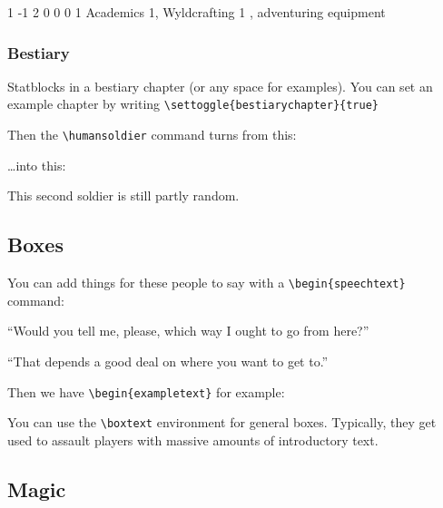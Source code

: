 \documentclass[a4paper,openany]{book}
\begin{document}
\begin{multicols}{2}
\begin{verbatim}
\end{verbatim}


{1}%
{-1}%
{{2}%
{0}%
{0}}%
{0}%
{1}%
{Academics 1, Wyldcrafting 1}%
{\longsword, adventuring equipment}%
{}

\subsubsection{Bestiary}

Statblocks in a bestiary chapter (or any space for examples).
You can set an example chapter by writing \verb"\settoggle{bestiarychapter}{true}"

Then the \verb"\humansoldier" command turns from this:

\humansoldier

\ldots into this:


\humansoldier

This second soldier is still partly random.

\subsection{Boxes}

You can add things for these people to say with a \verb"\begin{speechtext}" command:

\begin{speechtext}

  ``Would you tell me, please, which way I ought to go from here?''

  ``That depends a good deal on where you want to get to.''

\end{speechtext}

Then we have \verb"\begin{exampletext}" for example:

\begin{exampletext}
  You can use the \verb"\boxtext" environment for general boxes.
  Typically, they get used to assault players with massive amounts of introductory text.
\end{exampletext}

\subsection{Magic}


\end{multicols}
\end{document}
